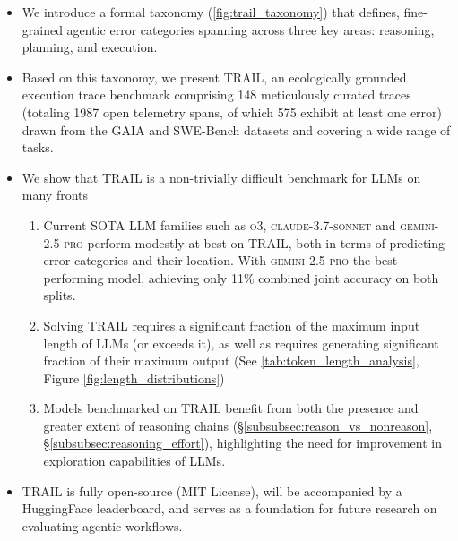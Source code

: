 \begin{itemize}[itemsep=1mm, parsep=0.5pt]
    \item We introduce a formal taxonomy (\autoref{fig:trail_taxonomy}) that defines, fine-grained agentic error categories spanning across three key areas: reasoning, planning, and execution.
    \item Based on this taxonomy, we present \textsc{TRAIL}, an ecologically grounded execution trace benchmark comprising 148 meticulously curated traces (totaling 1987 open telemetry spans, of which 575 exhibit at least one error) drawn from the GAIA \cite{mialon2023gaia} and SWE-Bench \cite{jimenez2024swebench} datasets and covering a wide range of tasks.
    \item We show that \textsc{TRAIL} is a non-trivially difficult benchmark for LLMs on many fronts
    \begin{enumerate}
        \item Current SOTA LLM families such as \textsc{o3}, \textsc{claude-3.7-sonnet} and \textsc{gemini-2.5-pro} perform modestly at best on \textsc{TRAIL}, both in terms of predicting error categories and their location. With \textsc{gemini-2.5-pro} the best performing model, achieving only 11\% combined joint accuracy on both splits.
        \item Solving \textsc{TRAIL} requires a significant fraction of the maximum input length of LLMs (or exceeds it), as well as requires generating  significant fraction of their maximum output (See \autoref{tab:token_length_analysis}, Figure \ref{fig:length_distributions})
        \item Models benchmarked on \textsc{TRAIL} benefit from both the presence and greater extent of reasoning chains (\S \ref{subsubsec:reason_vs_nonreason}, \S \ref{subsubsec:reasoning_effort}), highlighting the need for improvement in exploration capabilities of LLMs.
    \end{enumerate} 
    \item \textsc{TRAIL} is fully open-source (MIT License), will be accompanied by a HuggingFace leaderboard, and serves as a foundation for future research on evaluating agentic workflows.
\end{itemize} 


